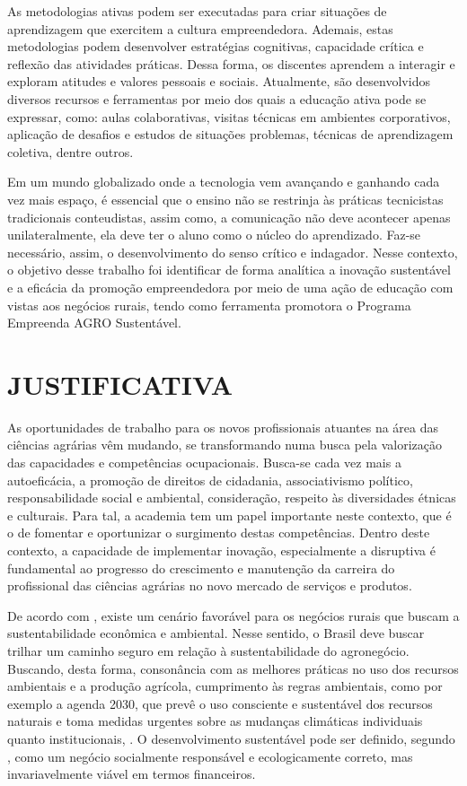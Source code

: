 As metodologias ativas podem ser executadas para criar situações de aprendizagem que exercitem a cultura empreendedora. Ademais, estas metodologias podem desenvolver estratégias cognitivas, capacidade crítica e reflexão das atividades práticas. Dessa forma, os discentes aprendem a interagir e exploram atitudes e valores pessoais e sociais. Atualmente, são desenvolvidos diversos recursos e ferramentas por meio dos quais a educação ativa pode se expressar, como: aulas colaborativas, visitas técnicas em ambientes corporativos, aplicação de desafios e estudos de situações problemas, técnicas de aprendizagem coletiva, dentre outros.

Em um mundo globalizado onde a tecnologia vem avançando e ganhando cada vez mais espaço, é essencial que o ensino não se restrinja às práticas tecnicistas tradicionais conteudistas, assim como, a comunicação não deve acontecer apenas unilateralmente, ela deve ter o aluno como o núcleo do aprendizado. Faz-se necessário, assim, o desenvolvimento do senso crítico e indagador. Nesse contexto, o objetivo desse trabalho foi identificar de forma analítica a inovação sustentável e a eficácia da promoção empreendedora por meio de uma ação de educação com vistas aos negócios rurais, tendo como ferramenta promotora o Programa Empreenda AGRO Sustentável.

\section{JUSTIFICATIVA}

As oportunidades de trabalho para os novos profissionais atuantes na área das ciências agrárias vêm mudando, se transformando numa busca pela valorização das capacidades e competências ocupacionais. Busca-se cada vez mais a autoeficácia, a promoção de direitos de cidadania, associativismo político, responsabilidade social e ambiental, consideração, respeito às diversidades étnicas e culturais. Para tal, a academia tem um papel importante neste contexto, que é o de fomentar e oportunizar o surgimento destas competências. Dentro deste contexto, a capacidade de implementar inovação, especialmente a disruptiva é fundamental ao progresso do crescimento e manutenção da carreira do profissional das ciências agrárias no novo mercado de serviços e produtos. 


De acordo com , existe um cenário favorável para os negócios rurais que buscam a sustentabilidade econômica e ambiental. Nesse sentido, o Brasil deve buscar trilhar um caminho seguro em relação à sustentabilidade do agronegócio. Buscando, desta forma, consonância com as melhores práticas no uso dos recursos ambientais e a produção agrícola, cumprimento às regras ambientais, como por exemplo a agenda 2030, que prevê o uso consciente e sustentável dos recursos naturais e toma medidas urgentes sobre as mudanças climáticas individuais quanto institucionais, \cite{filho_documentos_2017}. O desenvolvimento sustentável pode ser definido, segundo \cite{lara_ideologia_2017}, como um negócio socialmente responsável e ecologicamente correto, mas invariavelmente viável em termos financeiros.


